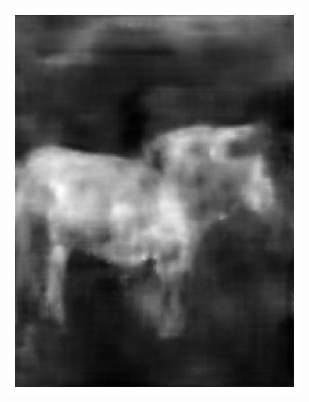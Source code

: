 \documentclass{l4proj}
\begin{document}
\begin{figure}[ht]
\begin{subfigure}[h!]{0.22\textwidth}
    \includegraphics[width=\textwidth, trim={0cm, 1cm, 0cm, 1cm}, clip]{images/autoencoder/pony_1/unet.png}


\end{subfigure}
\end{figure}
\end{document}

